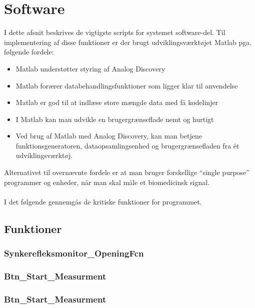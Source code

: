 \section{Software}

I dette afsnit beskrives de vigtigste scripts for systemet software-del. Til implementering af disse funktioner er der brugt udviklingsværktøjet Matlab pga. følgende fordele:

\begin{itemize}
\item  Matlab understøtter styring af Analog Discovery 
\item Matlab forærer databehandlingsfunktioner som ligger klar til anvendelse
\item Matlab er god til at indlæse store mængde data med få kodelinjer
\item I Matlab kan man udvikle en brugergrænseflade nemt og hurtigt 
\item Ved brug af Matlab med Analog Discovery, kan man betjene  funktionsgeneratoren, dataopsamlingsenhed og brugergrænsefladen  fra ét udviklingsværktøj.    
\end{itemize}  

Alternativet til overnævnte fordele er at man bruger forskellige “single purpose” programmer og enheder, når man skal måle et biomedicinsk signal. \\ \\
I det følgende gennemgås de kritiske funktioner for programmet.

\pagebreak

\subsection{Funktioner}
\subsubsection{Synkerefleksmonitor\_OpeningFcn}





\subsubsection{Btn\_Start\_Measurment}



\subsubsection{Btn\_Start\_Measurment}



